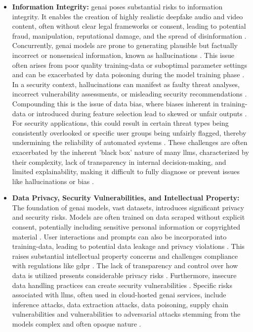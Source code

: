 \begin{itemize}
\item \textbf{Information Integrity:} \gls{genai} poses substantial risks to information integrity. It enables the creation of highly realistic deepfake audio and video content, often without clear legal frameworks or consent, leading to potential fraud, manipulation, reputational damage, and the spread of disinformation \cite{nyoto_cyber_2024}. Concurrently, \gls{genai} models are prone to generating plausible but factually incorrect or nonsensical information, known as hallucinations \cite{nyoto_cyber_2024, surathunmanun_exploring_2024}. This issue often arises from poor quality \gls{training-data} or suboptimal parameter settings \cite{surathunmanun_exploring_2024} and can be exacerbated by data poisoning during the model training phase \cite{nyoto_cyber_2024}. In a security context, hallucinations can manifest as faulty threat analyses, incorrect vulnerability assessments, or misleading security recommendations \cite{surathunmanun_exploring_2024}. Compounding this is the issue of data bias, where biases inherent in \gls{training-data} or introduced during feature selection lead to skewed or unfair outputs \cite{surathunmanun_exploring_2024}. For security applications, this could result in certain threat types being consistently overlooked or specific user groups being unfairly flagged, thereby undermining the reliability of automated systems \cite{surathunmanun_exploring_2024}. These challenges are often exacerbated by the inherent 'black box' nature of many \glspl{llm}, characterized by their complexity, lack of transparency in internal decision-making, and limited explainability, making it difficult to fully diagnose or prevent issues like hallucinations or bias \cite{dash_zero-trust_2024}.
\item \textbf{Data Privacy, Security Vulnerabilities, and Intellectual Property:} The foundation of \gls{genai} models, vast datasets, introduces significant privacy and security risks. Models are often trained on data scraped without explicit consent, potentially including sensitive personal information or copyrighted material \cite{nyoto_cyber_2024}. User interactions and prompts can also be incorporated into \gls{training-data}, leading to potential data leakage and privacy violations \cite{nyoto_cyber_2024}. This raises substantial intellectual property concerns and challenges compliance with regulations like \gls{gdpr} \cite{nyoto_cyber_2024}. The lack of transparency and control over how data is utilized presents considerable privacy risks \cite{nyoto_cyber_2024}. Furthermore, insecure data handling practices can create security vulnerabilities \cite{surathunmanun_exploring_2024}. Specific risks associated with \glspl{llm}, often used in cloud-hosted \gls{genai} services, include inference attacks, data extraction attacks, data poisoning, supply chain vulnerabilities \cite{surathunmanun_exploring_2024} and vulnerabilities to adversarial attacks stemming from the models complex and often opaque nature \cite{dash_zero-trust_2024}.

\end{itemize}
